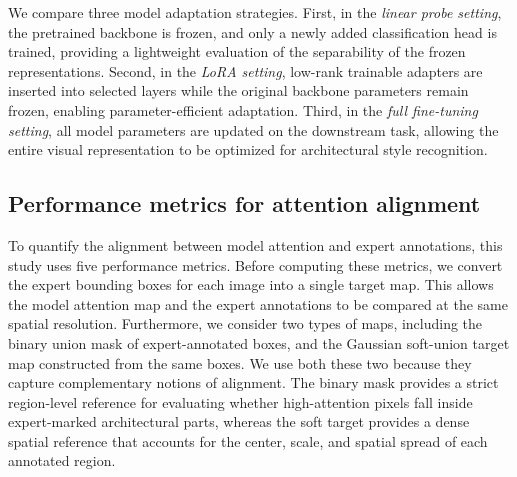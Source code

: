 \documentclass[lineno,pdflatex,sn-mathphys-num]{sn-jnl}%
\theoremstyle{thmstyleone}%
\theoremstyle{thmstyletwo}%
\theoremstyle{thmstylethree}%
\begin{document}
We compare three model adaptation strategies. First, in the \textit{linear probe setting}, the pretrained backbone is frozen, and only a newly added classification head is trained, providing a lightweight evaluation of the separability of the frozen representations. Second, in the \textit{LoRA setting}, low-rank trainable adapters are inserted into selected layers while the original backbone parameters remain frozen, enabling parameter-efficient adaptation. Third, in the \textit{full fine-tuning setting}, all model parameters are updated on the downstream task, allowing the entire visual representation to be optimized for architectural style recognition.

\subsection{Performance metrics for attention alignment}

To quantify the alignment between model attention and expert annotations, this study uses five performance metrics. Before computing these metrics, we convert the expert bounding boxes for each image into a single target map. This allows the model attention map and the expert annotations to be compared at the same spatial resolution. Furthermore, we consider two types of maps, including the binary union mask of expert-annotated boxes, and the Gaussian soft-union target map constructed from the same boxes. We use both these two because they capture complementary notions of alignment. The binary mask provides a strict region-level reference for evaluating whether high-attention pixels fall inside expert-marked architectural parts, whereas the soft target provides a dense spatial reference that accounts for the center, scale, and spatial spread of each annotated region.
\end{document}
